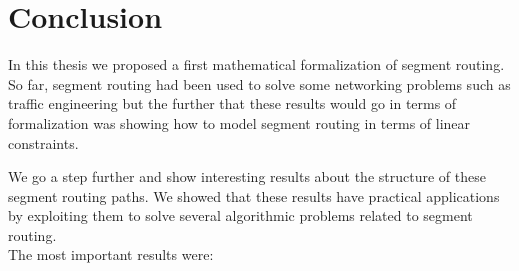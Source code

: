 \documentclass[a4paper,10pt]{book}
\newcommand{\todo}[1]{{\color{red}\textbf{TODO:~}#1}}
\begin{document}
\tableofcontents










\chapter{Conclusion}

In this thesis we proposed a first mathematical formalization of segment routing. So far, segment routing had been used
to solve some networking problems such as traffic engineering but the further that these results would go in terms of 
formalization was showing how to model segment routing in terms of linear constraints.

We go a step further and show interesting results about the structure of these segment routing paths. We showed that these
results have practical applications by exploiting them to solve several algorithmic problems related to segment routing. \\

The most important results were:
\end{document}
